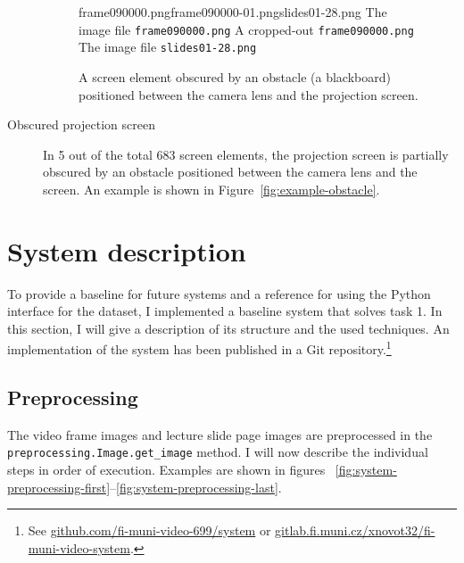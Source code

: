 \begin{description}
  \begin{figure}[!t]
    \inputminted{xml}{fig/examples/obstacle/example.xml}\par
      {frame090000.png}{frame090000-01.png}{slides01-28.png}%
      {The image file \texttt{frame090000.png}}%
      {A cropped-out \texttt{frame090000.png}}%
      {The image file \texttt{slides01-28.png}}
    \caption{A screen element obscured by an obstacle (a blackboard) positioned
      between the camera lens and the projection screen.}
    \label{fig:example-obstacle}
    \label{fig:example-last}
  \end{figure}
  \item[Obscured projection screen] In 5 out of the total 683 screen elements,
    the projection screen is partially obscured by an obstacle positioned
    between the camera lens and the screen.
    An example is shown in Figure~\ref{fig:example-obstacle}.
\end{description}

\FloatBarrier
\section{System description}
\label{sec:system-description}
To provide a baseline for future systems and a reference for using the Python
interface for the dataset, I implemented a baseline system that solves task 1.
In this section, I will give a description of its structure and the used
techniques.  An implementation of the system has been published in a Git
repository.\footnote{See
  \href{https://github.com/fi-muni-video-699/system}%
       {github.com/fi-muni-video-699/system} or
  \href{https://gitlab.fi.muni.cz/xnovot32/fi-muni-video-system}%
       {gitlab.fi.muni.cz/xnovot32/fi-muni-video-system}.}

\FloatBarrier
\subsection{Preprocessing}
The video frame images and lecture slide page images are preprocessed in the
\texttt{preprocessing.Image.get\_image} method. I will now describe the
individual steps in order of execution. Examples are shown in figures~%
\ref{fig:system-preprocessing-first}--\ref{fig:system-preprocessing-last}.

